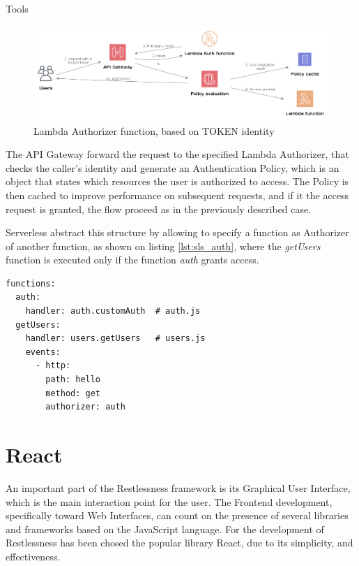 \begin{chapter}{Tools}
    \begin{figure}
        \centering
        \includegraphics[width=\linewidth]{source/diagrams/lambda_authorizer.png}
        \caption{Lambda Authorizer function, based on TOKEN identity}
        \label{fig:lambda_with_auth}
    \end{figure}

    The API Gateway forward the request to the specified Lambda Authorizer, that
    checks the caller's identity and generate an Authentication Policy, which is
    an object that states which resources the user is authorized to access.
    The Policy is then cached to improve performance on subsequent requests, and
    if it the access request is granted, the flow proceed as in the previously
    described case.

    Serverless abstract this structure by allowing to specify a function as
    Authorizer of another function, as shown on listing \ref{lst:sls_auth}, where
    the \textit{getUsers} function is executed only if the function \textit{auth}
    grants access.

    \bigskip
    \begin{lstlisting}[caption=Authorizer definition on Serverless, label={lst:sls_auth}]
functions:
  auth:
    handler: auth.customAuth  # auth.js
  getUsers:
    handler: users.getUsers   # users.js
    events:
      - http:
        path: hello
        method: get
        authorizer: auth
    \end{lstlisting}

    \section{React}
    An important part of the Restlessness framework is its Graphical User Interface,
    which is the main interaction point for the user. The Frontend development,
    specifically toward Web Interfaces, can count on the presence of several
    libraries and frameworks based on the JavaScript language. For the development
    of Restlessness has been chosed the popular library React, due to its simplicity,
    and effectiveness.


\end{chapter}
